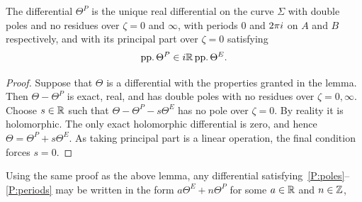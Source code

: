 \documentclass{article}
\begin{document}
\begin{lem}\label{lem:theta2_characterisation}
The differential $\Theta^P$ is the unique real differential on the curve $\Sigma$ with double poles and no residues over $\zeta=0$ and $\infty$, with periods $0$ and $2\pi i$ on $A$ and $B$ respectively, and with its principal part over $\zeta=0$ satisfying
\[
\operatorname{pp.} \Theta^P \in i \mathbb{R} \operatorname{pp.} \Theta^E.
\]
\begin{proof}

Suppose that $\Theta$ is a differential with the properties granted in the lemma. Then $\Theta-\Theta^P$ is exact, real, and has double poles with no residues over $\zeta = 0,\infty$. Choose $s\in\mathbb{R}$ such that $\Theta-\Theta^P - s\Theta^E$ has no pole over $\zeta = 0$. By reality it is holomorphic. The only exact holomorphic differential is zero, and hence $\Theta = \Theta^P + s \Theta^E$.
As taking principal part is a linear operation, the final condition forces $s=0$.
\end{proof}
\end{lem}

Using the same proof as the above lemma, any differential satisfying~\ref{P:poles}--\ref{P:periods} may be written in the form $a \Theta^E + n \Theta^P$ for some $a\in\mathbb{R}$ and $n\in\mathbb{Z}$, 
\end{document}
